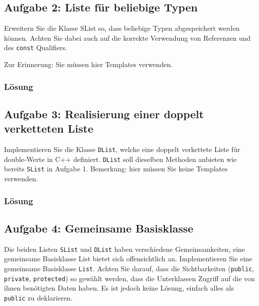 
\noindent\makebox[\linewidth]{\rule{\paperwidth}{0.4pt}}


\subsection{Aufgabe 2: Liste für beliebige Typen}

Erweitern Sie die Klasse SList so, dass beliebige Typen abgespeichert werden können. Achten Sie dabei
auch auf die korrekte Verwendung von Referenzen und des \texttt{const} Qualifiers.

Zur Erinnerung: Sie müssen hier Templates verwenden.

\subsubsection{Lösung}



\subsection{Aufgabe 3: Realisierung einer doppelt verketteten Liste}

Implementieren Sie die Klasse \texttt{DList}, welche eine doppelt verkettete Liste für double-Werte in C++ definiert.
\texttt{DList} soll dieselben Methoden anbieten wie bereits \texttt{SList} in Aufgabe 1.
Bemerkung: hier müssen Sie keine Templates verwenden.

\subsubsection{Lösung}


\noindent\makebox[\linewidth]{\rule{\paperwidth}{0.4pt}}


\subsection{Aufgabe 4: Gemeinsame Basisklasse}

Die beiden Listen \texttt{SList} und \texttt{DList} haben verschiedene Gemeinsamkeiten, eine gemeinsame Basisklasse
List bietet sich offensichtlich an. Implementieren Sie eine gemeinsame Basisklasse \texttt{List}. Achten Sie darauf,
dass die Sichtbarkeiten (\texttt{public}, \texttt{private}, \texttt{protected}) so gewählt werden, dass die Unterklassen Zugriff
auf die von ihnen benötigten Daten haben. Es ist jedoch keine Lösung, einfach alles als \texttt{public} zu deklarieren.

